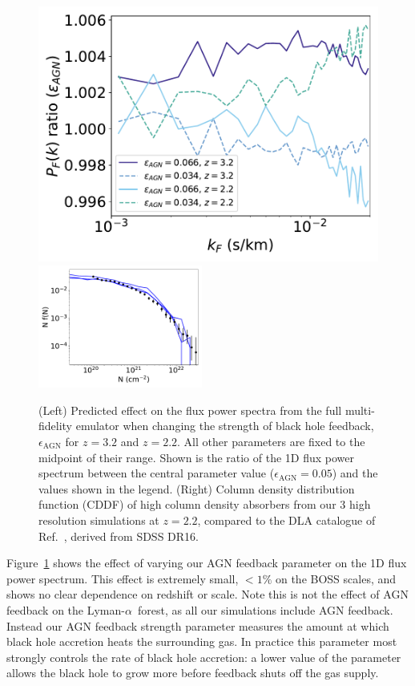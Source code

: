 \documentclass[a4paper,11pt]{article}
\newcommand{\Lya}{Lyman-$\alpha$}
\begin{document}
\begin{figure}
\centering
\includegraphics[width=0.48\columnwidth]{figures/single_param_bhfeedback.pdf}
\includegraphics[width=0.48\textwidth]{figures/cddf_hires.pdf}
 \caption{(Left) Predicted effect on the flux power spectra from the full multi-fidelity emulator when changing the strength of black hole feedback, $\epsilon_\mathrm{AGN}$ for $z=3.2$ and $z=2.2$. All other parameters are fixed to the midpoint of their range. Shown is the ratio of the 1D flux power spectrum between the central parameter value ($\epsilon_\mathrm{AGN} = 0.05$) and the values shown in the legend.  (Right) Column density distribution function (CDDF) of high column density absorbers from our $3$ high resolution simulations at $z=2.2$, compared to the DLA catalogue of Ref.~\cite{2021MNRAS.507..704H}, derived from SDSS DR16.}
 \label{fig:DLACDDF}
\end{figure}

Figure~\ref{fig:DLACDDF} shows the effect of varying our AGN feedback parameter on the 1D flux power spectrum. This effect is extremely small, $<1\%$ on the BOSS scales, and shows no clear dependence on redshift or scale. Note this is not the effect of AGN feedback on the \Lya~forest, as all our simulations include AGN feedback. Instead our AGN feedback strength parameter measures the amount at which black hole accretion heats the surrounding gas. In practice this parameter most strongly controls the rate of black hole accretion: a lower value of the parameter allows the black hole to grow more before feedback shuts off the gas supply.
\end{document}
